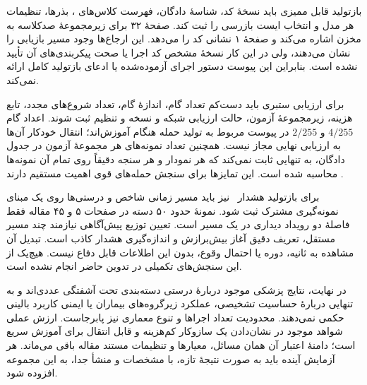 بازتولید قابل ممیزی باید نسخهٔ کد، شناسهٔ دادگان، فهرست کلاس‌های ، بذرها، تنظیمات هر مدل و انتخاب ایست بازرسی را ثبت کند. صفحهٔ ۳۲ برای زیرمجموعهٔ صدکلاسه به مخزن  اشاره می‌کند و صفحهٔ ۱ نشانی کد  را می‌دهد. این ارجاع‌ها وجود مسیر بازیابی را نشان می‌دهند، ولی در این کار نسخهٔ مشخص کد اجرا یا صحت پیکربندی‌های آن تأیید نشده است. بنابراین این پیوست دستور اجرای آزموده‌شده یا ادعای بازتولید کامل ارائه نمی‌کند.

برای ارزیابی ستبری باید دست‌کم تعداد گام، اندازهٔ گام، تعداد شروع‌های مجدد، تابع هزینه، زیرمجموعهٔ آزمون، حالت ارزیابی شبکه و نسخه و تنظیم  ثبت شوند. اعداد گام $4/255$ و $2/255$ در پیوست  مربوط به تولید حمله هنگام آموزش‌اند؛ انتقال خودکار آن‌ها به ارزیابی نهایی مجاز نیست. همچنین تعداد نمونه‌های هر مجموعهٔ آزمون در جدول دادگان، به تنهایی ثابت نمی‌کند که هر نمودار و هر سنجه دقیقاً روی تمام آن نمونه‌ها محاسبه شده است. این تمایزها برای سنجش حمله‌های قوی اهمیت مستقیم دارند \cite{croce2020reliable}.

برای بازتولید هشدار \pertalign\ نیز باید مسیر زمانی شاخص و درستی‌ها روی یک مبنای نمونه‌گیری مشترک ثبت شود. نمونهٔ حدود ۵۰ دسته در صفحات ۵ و ۴۵ مقاله فقط فاصلهٔ دو رویداد دیداری در یک مسیر است. تعیین توزیع پیش‌آگاهی نیازمند چند مسیر مستقل، تعریف دقیق آغاز بیش‌برازش و اندازه‌گیری هشدار کاذب است. تبدیل آن مشاهده به ثانیه، دوره یا احتمال وقوع، بدون این اطلاعات قابل دفاع نیست. هیچ‌یک از این سنجش‌های تکمیلی در تدوین حاضر انجام نشده است.

در نهایت، نتایج پزشکی موجود دربارهٔ درستی دسته‌بندی تحت آشفتگی عددی‌اند و به تنهایی دربارهٔ حساسیت تشخیصی، عملکرد زیرگروه‌های بیماران یا ایمنی کاربرد بالینی حکمی نمی‌دهند. محدودیت تعداد اجراها و تنوع معماری نیز پابرجاست. ارزش عملی شواهد موجود در نشان‌دادن یک سازوکار کم‌هزینه و قابل انتقال برای آموزش سریع است؛ دامنهٔ اعتبار آن همان مسائل، معیارها و تنظیمات مستند مقاله باقی می‌ماند. هر آزمایش آینده باید به صورت نتیجهٔ تازه، با مشخصات و منشأ جدا، به این مجموعه افزوده شود.
